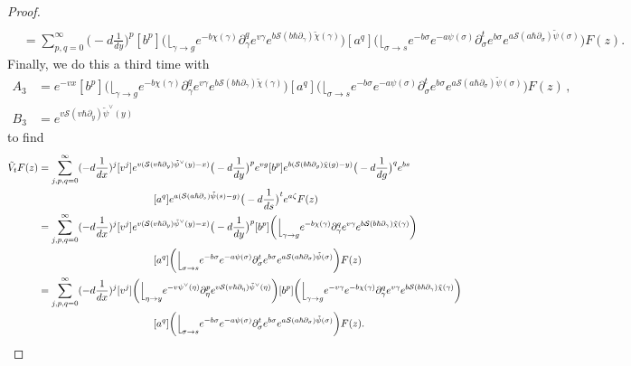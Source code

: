 \documentclass[10pt,a4paper,oneside,no-math,reqno]{amsart}%
\theoremstyle{plain}
\theoremstyle{definition}
\theoremstyle{remark}
\numberwithin{equation}{section}
\newcommand{\mc}[1]{\mathcal{#1}}
\newcommand{\1}{\mathds{1}}
\newcommand{\<}{\langle}
\renewcommand{\>}{\rangle}
\newcommand{\del}{\partial}
\begin{document}
\begin{proof}
\begin{equation*}
\begin{split}
			\\
			&=
			\sum_{p,q=0}^\infty \big( -d \frac{1}{dy} \big)^p  [b^p ] 
			\bigg(  \Big\lfloor_{\gamma \to g} e^{-b \chi (\gamma)} \del_{\gamma}^q e^{v \gamma} e^{b \mc{S}(b \hbar \del_{\gamma})\tilde{\chi} (\gamma) } \bigg) [a^q]
			\bigg(  \Big\lfloor_{\sigma \to s} e^{-b \sigma} e^{-a \psi (\sigma)} \del_{\sigma}^t e^{b \sigma} e^{a \mc{S}(a \hbar \del_{\sigma})\tilde{\psi} (\sigma) } \bigg) F(z) .
		\end{split}
	\end{equation*}
	Finally, we do this a third time with
	\begin{equation}
		\begin{split}
			A_3
			&=
			e^{-vx} [b^p ] 
			\bigg(  \Big\lfloor_{\gamma \to g} e^{-b \chi (\gamma)} \del_\gamma^q e^{v \gamma} e^{b \mc{S}(b \hbar \del_\gamma) \tilde{\chi} (\gamma) } \bigg) [a^q]
			\bigg(  \Big\lfloor_{\sigma \to s} e^{-b \sigma} e^{-a \psi (\sigma)} \del_\sigma^t e^{b \sigma} e^{a \mc{S}(a \hbar \del_\sigma )\tilde{\psi} (\sigma) } \bigg) F(z)
			\,,
			\\
			B_3
			&=
			e^{v \mc{S}(v \hbar \del_y) \tilde{\psi}^\vee (y)} 
		\end{split}
	\end{equation}
	to find
	\begin{align*}
			\tilde{V}_t F (z)
			&=
			\sum_{j,p,q=0}^\infty (-d \frac{1}{dx})^j [v^j] 
			e^{v ( \mc{S}(v\hbar \del_{y}) \tilde{\psi}^\vee(y) - x )} \big( -d \frac{1}{dy} \big)^p e^{vg} [b^p ]
			e^{b ( \mc{S}(b\hbar \del_g) \tilde{\chi}(g) - y )} \big( -d \frac{1}{dg} \big)^q e^{bs} 
			\\
			&\hspace{4cm}
			[a^q ]
			e^{a ( \mc{S}(a \hbar \del_s) \tilde{\psi}(s) - g )} \big( -d \frac{1}{ds} \big)^t e^{a \zeta} F(z)
			\\
			&=
			\sum_{j,p,q=0}^\infty (-d \frac{1}{dx})^j [v^j] 
			e^{v ( \mc{S}(v\hbar \del_{y}) \tilde{\psi}^\vee(y) - x )} \big( -d \frac{1}{dy} \big)^p [b^p ]
			\bigg( \Big\lfloor_{\gamma \to g} e^{-b \chi (\gamma)} \del_{\gamma}^q e^{v \gamma} e^{b \mc{S}(b \hbar \del_\gamma)\tilde{\chi} (\gamma) } \bigg) 
			\\
			&\hspace{4cm} 
			[a^q] \bigg(  \Big\lfloor_{\sigma \to s} e^{-b \sigma} e^{-a \psi (\sigma)} \del_\sigma^t e^{b \sigma} e^{a \mc{S}(a \hbar \del_\sigma)\tilde{\psi} (\sigma) } \bigg) F(z)
			\\
			&=
			\sum_{j,p,q=0}^\infty (-d \frac{1}{dx})^j [v^j] 
			\bigg(  \Big\lfloor_{\eta \to y} e^{-v \psi^\vee (\eta)} \del_\eta^p  e^{v \mc{S}(v \hbar \del_\eta) \tilde{\psi}^\vee (\eta)}\bigg)
			[b^p ] \bigg( \Big\lfloor_{\gamma \to g}e^{-v \gamma} e^{-b \chi (\gamma)} \del_\gamma^q e^{v \gamma} e^{b \mc{S}(b \hbar \del_\gamma)\tilde{\chi} (\gamma) } \bigg) 
			\\
			&\hspace{4cm}
			[a^q] \bigg(  \Big\lfloor_{\sigma \to s} e^{-b \sigma} e^{-a \psi (\sigma)} \del_\sigma^t e^{b \sigma} e^{a \mc{S}(a \hbar \del_\sigma)\tilde{\psi} (\sigma) } \bigg) F(z) . \qedhere
	\end{align*}
\end{proof}
\end{document}
